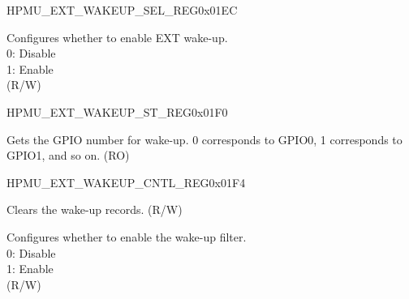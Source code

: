 \begin{register}{H}{PMU\_EXT\_WAKEUP\_SEL\_REG}{0x01EC}\label{regdesc:PMUEXTWAKEUPSELREG}
%
\regnewline%
\begin{regdesc}\begin{reglist}
\label{fielddesc:PMUEXTWAKEUPSEL}\item [PMU\_EXT\_WAKEUP\_SEL] Configures whether to enable EXT wake-up.\\
0: Disable\\
1: Enable\\
(R/W)

\end{reglist}\end{regdesc}
\end{register}


\begin{register}{H}{PMU\_EXT\_WAKEUP\_ST\_REG}{0x01F0}\label{regdesc:PMUEXTWAKEUPSTREG}
%
\regnewline%
\begin{regdesc}\begin{reglist}
\label{fielddesc:PMUEXTWAKEUPSTATUS}\item [PMU\_EXT\_WAKEUP\_STATUS] Gets the GPIO number for wake-up. 0 corresponds to GPIO0, 1 corresponds to GPIO1, and so on. (RO)
\end{reglist}\end{regdesc}
\end{register}


\begin{register}{H}{PMU\_EXT\_WAKEUP\_CNTL\_REG}{0x01F4}\label{regdesc:PMUEXTWAKEUPCNTLREG}
%
%
%
\regnewline%
\begin{regdesc}\begin{reglist}
\label{fielddesc:PMUEXTWAKEUPSTATUSCLR}\item [PMU\_EXT\_WAKEUP\_STATUS\_CLR] Clears the wake-up records. (R/W)
\label{fielddesc:PMUEXTWAKEUPFILTER}\item [PMU\_EXT\_WAKEUP\_FILTER] Configures whether to enable the wake-up filter. \\
0: Disable \\
1: Enable \\
(R/W)
\end{reglist}\end{regdesc}
\end{register}



